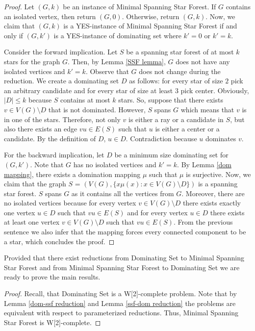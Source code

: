 \documentclass[en]{pracamgr}
\theoremstyle{definition}
\newcommand{\mssfp}{{\sc Minimal Spanning Star Forest}}
\newcommand{\domset}{dominating set}
\newcommand{\domsetp}{{\sc Dominating Set}}
\begin{document}
\begin{proof}
	Let $(G,k)$ be an instance of \mssfp{}. If $G$ contains an isolated vertex, then return $(G,0)$. Otherwise, return $(G,k)$. Now, we claim that $(G,k)$ is a YES-instance of \mssfp{} if and only if $(G,k')$ is a YES-instance of \domset{} where $k'=0$ or $k'=k$.
	
	Consider the forward implication. Let $S$ be a spanning star forest of at most $k$ stars for the graph $G$. Then, by Lemma \ref{SSF lemma}, $G$ does not have any isolated vertices and $k'=k$. Observe that $G$ does not change during the reduction. We create a dominating set $D$ as follows: for every star of size $2$ pick an arbitrary candidate and for every star of size at least $3$ pick center. Obviously, $|D| \leq k$ because $S$ contains at most $k$ stars. So, suppose that there exists $v \in V(G) \setminus D$ that is not dominated. However, $S$ spans $G$ which means that $v$ is in one of the stars. Therefore, not only $v$ is either a ray or a candidate in $S$, but also there exists an edge $vu \in E(S)$ such that $u$ is either a center or a candidate. By the definition of $D$, $u \in D$. Contradiction because $u$ dominates $v$.
	
	For the backward implication, let $D$ be a minimum size dominating set for $(G,k')$. Note that $G$ has no isolated vertices and $k'=k$. By Lemma \ref{dom mapping}, there exists a domination mapping $\mu$ such that $\mu$ is surjective. Now, we claim that the graph $S$ = $(V(G), \{x\mu(x): x \in V(G) \setminus D\})$ is a spanning star forest. $S$ spans $G$ as it contains all the vertices from $G$. Moreover, there are no isolated vertices because for every vertex $v \in V(G) \setminus D$ there exists exactly one vertex $u \in D$ such that $vu \in E(S)$ and for every vertex $u \in D$ there exists at least one vertex $v \in V(G) \setminus D$ such that $vu \in E(S)$. From the previous sentence we also infer that the mapping forces every connected component to be a star, which concludes the proof.
\end{proof}

Provided that there exist reductions from \domsetp{} to \mssfp{} and from \mssfp{} to \domsetp{} we are ready to prove the main results.

\thmmssfpwc*

\begin{proof}
	Recall, that \domsetp{} is a W[2]-complete problem. Note that by Lemma \ref{dom-ssf reduction} and Lemma \ref{ssf-dom reduction} the problems are equivalent with respect to parameterized reductions. Thus, \mssfp{} is W[2]-complete.
\end{proof}
\end{document}
